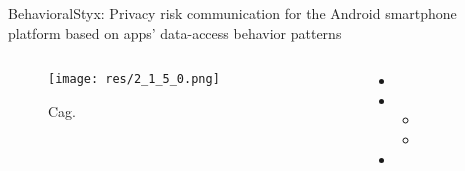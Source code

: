 \begin{frame}{Behavioral}{Styx: Privacy risk communication for the Android smartphone platform based on apps' data-access behavior patterns \cite{bal_styx_2015}}

	\begin{columns}
		\begin{column}{0.5\textwidth}
			\begin{center}
			
				\begin{figure}
					\texttt{[image: res/2\_1\_5\_0.png]}
					\caption{\label{fig:2_1_5_0}Cag.}
				\end{figure}
				
			\end{center}
		\end{column}
		
		\begin{column}{0.5\textwidth}
		
			\begin{itemize}
				\item 
				
				\item 
					\begin{itemize}
						\item 
						\item 
					\end{itemize}
				
				\item 
			\end{itemize}
			
		\end{column}
	\end{columns}
	

\end{frame}

